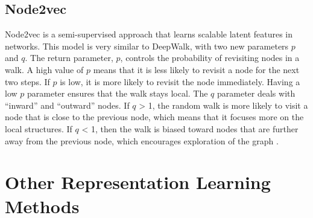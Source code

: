 \subsection{Node2vec}
\label{subsection:node2vec}
Node2vec is a semi-supervised approach that learns scalable latent features in networks.
This model is very similar to DeepWalk, with two new parameters $p$ and $q$. The return parameter, $p$, controls the probability of revisiting nodes in a walk.
A high value of $p$ means that it is less likely to revisit a node for the next two steps.
If $p$ is low, it is more likely to revisit the node immediately. Having a low $p$ parameter ensures that the walk stays local.
The $q$ parameter deals with “inward” and “outward” nodes.
If $q$ > 1, the random walk is more likely to visit a node that is close to the previous node, which means that it focuses more on the local structures.
If $q$ < 1, then the walk is biased toward nodes that are further away from the previous node, which encourages exploration of the graph \cite{grover_node2vec:_2016}.

\begin{figure}[h!]
\end{figure}
\section{Other Representation Learning Methods}

